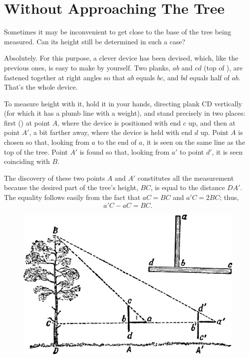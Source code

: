 \section{Without Approaching The Tree}
\label{sec-1.6}

Sometimes it may be inconvenient to get close to the base of the tree being measured. Can its height still be determined in such a case?

Absolutely. For this purpose, a clever device has been devised, which, like the previous ones, is easy to make by yourself. Two planks, $ab$ and $cd$ (top of ), are fastened together at right angles so that $ab$ equals $bc$, and $bd$ equals half of $ab$. That's the whole device. 

To measure height with it, hold it in your hands, directing plank CD vertically (for which it has a plumb line with a weight), and stand precisely in two places: first () at point $A$, where the device is positioned with end $c$ up, and then at point $A'$, a bit farther away, where the device is held with end $d$ up. Point $A$ is chosen so that, looking from $a$ to the end of $a$, it is seen on the same line as the top of the tree. Point $A'$ is found so that, looking from $a'$ to point $d'$, it is seen coinciding with $B$. 

The discovery of these two points $A$ and $A'$ constitutes all the measurement because the desired part of the tree's height, $BC$, is equal to the distance $DA'$. The equality follows easily from the fact that $aC = BC$ and $a'C = 2BC$; thus,
\begin{equation*}%
a'C - aC = BC.
\end{equation*}


\begin{figure}[h!]
\centering
\includegraphics[width=\textwidth]{figures/ch-01/fig-01-10.pdf}
\end{figure}





